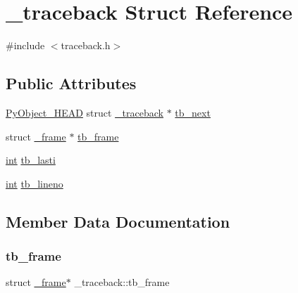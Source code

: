 \hypertarget{struct__traceback}{}\section{\+\_\+traceback Struct Reference}
\label{struct__traceback}


{\ttfamily \#include $<$traceback.\+h$>$}

\subsection*{Public Attributes}
\begin{DoxyCompactItemize}
\item 
\mbox{\hyperlink{_python27_2object_8h_a0bf35c1f3ea13f925de94d8593db3b7e}{Py\+Object\+\_\+\+H\+E\+AD}} struct \mbox{\hyperlink{struct__traceback}{\+\_\+traceback}} $\ast$ \mbox{\hyperlink{struct__traceback_a1e0463e0fd57e8164db5b4a07144c020}{tb\+\_\+next}}
\item 
struct \mbox{\hyperlink{struct__frame}{\+\_\+frame}} $\ast$ \mbox{\hyperlink{struct__traceback_a53fe070d6b151c9f772793bf85144f38}{tb\+\_\+frame}}
\item 
\mbox{\hyperlink{warnings_8h_a74f207b5aa4ba51c3a2ad59b219a423b}{int}} \mbox{\hyperlink{struct__traceback_a0248a175c30f2702a3d4386968732d0e}{tb\+\_\+lasti}}
\item 
\mbox{\hyperlink{warnings_8h_a74f207b5aa4ba51c3a2ad59b219a423b}{int}} \mbox{\hyperlink{struct__traceback_a1368fff0890e04dce41ffa6aecb06628}{tb\+\_\+lineno}}
\end{DoxyCompactItemize}


\subsection{Member Data Documentation}
\mbox{\label{struct__traceback_a53fe070d6b151c9f772793bf85144f38}} 
\subsubsection{\texorpdfstring{tb\_frame}{tb\_frame}}
{\footnotesize\ttfamily struct \mbox{\hyperlink{struct__frame}{\+\_\+frame}}$\ast$ \+\_\+traceback\+::tb\+\_\+frame}

\mbox{\label{struct__traceback_a0248a175c30f2702a3d4386968732d0e}} 
